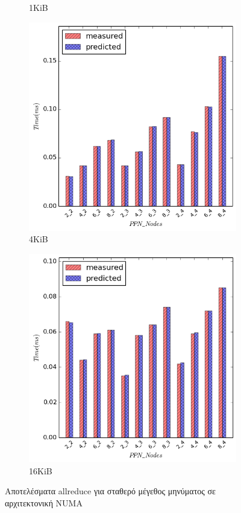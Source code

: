 \begin{figure}[H]
\begin{subfigure}[b]{0.4\textwidth}
        \caption{1KiB}
    \end{subfigure}
    \quad
        \begin{subfigure}[b]{0.4\textwidth}
        \includegraphics[width=\textwidth]{./images/allreduce_NUMA/allreduce_4096.png}
        \caption{4KiB}
    \end{subfigure}
    \quad
        \begin{subfigure}[b]{0.4\textwidth}
        \includegraphics[width=\textwidth]{./images/allreduce_NUMA/allreduce_16384.png}
        \caption{16KiB}
    \end{subfigure}

    \caption{Αποτελέσματα allreduce για σταθερό μέγεθος μηνύματος σε αρχιτεκτονική NUMA}
        \label{fig:allreduce_sizes_NUMA}
\end{figure}
